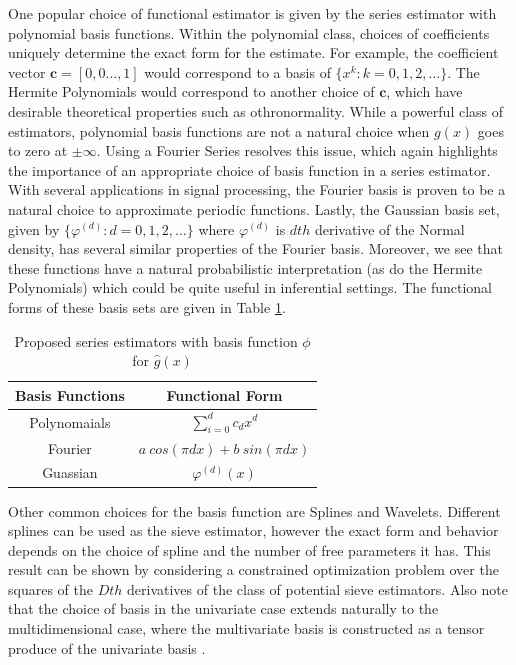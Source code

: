 \documentclass[12pt]{article}  %
\begin{document}
One popular choice of functional estimator is given by the series estimator with polynomial basis functions. Within the polynomial class, choices of coefficients uniquely determine the exact form for the estimate. For example, the coefficient vector $\textbf{c} = [0,0 \ldots, 1]$ would correspond to a basis of $\{x^{k}: k = 0,1,2,\ldots\}$. The Hermite Polynomials would correspond to another choice of $\textbf{c}$, which have desirable theoretical properties such as othronormality. While a powerful class of estimators, polynomial basis functions are not a natural choice when $g(x)$ goes to zero at $\pm \infty$. Using a Fourier Series resolves this issue, which again highlights the importance of an appropriate choice of basis function in a series estimator. With several applications in signal processing, the Fourier basis is proven to be a natural choice to approximate periodic functions. Lastly, the Gaussian basis set, given by $\{\varphi^{(d)}:d= 0,1,2,\dots\}$ where $\varphi^{(d)}$ is $dth$ derivative of the Normal density, has several similar properties of the Fourier basis. Moreover, we see that these functions have a natural probabilistic interpretation (as do the Hermite Polynomials) which could be quite useful in inferential settings. The functional forms of these basis sets are given in Table \ref{tab:basis}. 

\begin{table}[h]
\begin{center}
\begin{tabular}{|c|c|}
\hline
Basis Functions & Functional Form\\
\hline
Polynomaials & $\sum_{i=0}^{d} c_d x^d$\\
Fourier &$a~cos(\pi d x) + b~sin(\pi d x)$\\
Guassian &$\varphi^{(d)}(x)$\\
\hline
\end{tabular}
\caption {Proposed series estimators with basis function $\phi$ for $\hat{g}(x)$ }
\label{tab:basis}
\end{center}
\end{table}

Other common choices for the basis function are Splines and Wavelets.  Different splines can be used as the sieve estimator, however the exact form and behavior depends on the choice of spline and the number of free parameters it has.  This result can be shown by considering a constrained optimization problem over the squares of the $Dth$ derivatives of the class of potential sieve estimators. Also note that the choice of basis in the univariate case extends naturally to the multidimensional case, where the multivariate basis is constructed as a tensor produce of the univariate basis \cite{Chen}.
\end{document}
